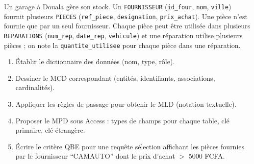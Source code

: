\documentclass[11pt]{article}
\begin{document}
\begin{exercice}
Un garage à Douala gère son stock. Un \texttt{FOURNISSEUR} (\texttt{id\_four}, \texttt{nom}, \texttt{ville}) fournit plusieurs \texttt{PIECES} (\texttt{ref\_piece}, \texttt{designation}, \texttt{prix\_achat}). Une pièce n'est fournie que par un seul fournisseur. Chaque pièce peut être utilisée dans plusieurs \texttt{REPARATIONS} (\texttt{num\_rep}, \texttt{date\_rep}, \texttt{vehicule}) et une réparation utilise plusieurs pièces ; on note la \texttt{quantite\_utilisee} pour chaque pièce dans une réparation.
\begin{enumerate}
\item Établir le dictionnaire des données (nom, type, rôle).
\item Dessiner le MCD correspondant (entités, identifiants, associations, cardinalités).
\item Appliquer les règles de passage pour obtenir le MLD (notation textuelle).
\item Proposer le MPD sous Access : types de champs pour chaque table, clé primaire, clé étrangère.
\item Écrire le critère QBE pour une requête sélection affichant les pièces fournies par le fournisseur ``CAMAUTO'' dont le prix d'achat $>$ 5000 FCFA.
\end{enumerate}
\end{exercice}
\end{document}
